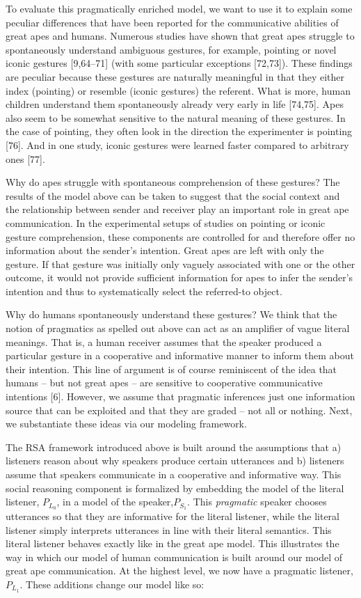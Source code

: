 \documentclass[
  english,
  man,floatsintext]{apa6}
\begin{document}
To evaluate this pragmatically enriched model, we want to use it to explain some peculiar differences that have been reported for the communicative abilities of great apes and humans. Numerous studies have shown that great apes struggle to spontaneously understand ambiguous gestures, for example, pointing or novel iconic gestures {[}9,64--71{]} (with some particular exceptions {[}72,73{]}). These findings are peculiar because these gestures are naturally meaningful in that they either index (pointing) or resemble (iconic gestures) the referent. What is more, human children understand them spontaneously already very early in life {[}74,75{]}. Apes also seem to be somewhat sensitive to the natural meaning of these gestures. In the case of pointing, they often look in the direction the experimenter is pointing {[}76{]}. And in one study, iconic gestures were learned faster compared to arbitrary ones {[}77{]}.

Why do apes struggle with spontaneous comprehension of these gestures? The results of the model above can be taken to suggest that the social context and the relationship between sender and receiver play an important role in great ape communication. In the experimental setups of studies on pointing or iconic gesture comprehension, these components are controlled for and therefore offer no information about the sender's intention. Great apes are left with only the gesture. If that gesture was initially only vaguely associated with one or the other outcome, it would not provide sufficient information for apes to infer the sender's intention and thus to systematically select the referred-to object.

Why do humans spontaneously understand these gestures? We think that the notion of pragmatics as spelled out above can act as an amplifier of vague literal meanings. That is, a human receiver assumes that the speaker produced a particular gesture in a cooperative and informative manner to inform them about their intention. This line of argument is of course reminiscent of the idea that humans -- but not great apes -- are sensitive to cooperative communicative intentions {[}6{]}. However, we assume that pragmatic inferences just one information source that can be exploited and that they are graded -- not all or nothing. Next, we substantiate these ideas via our modeling framework.

The RSA framework introduced above is built around the assumptions that a) listeners reason about why speakers produce certain utterances and b) listeners assume that speakers communicate in a cooperative and informative way. This social reasoning component is formalized by embedding the model of the literal listener, \(P_{L_0}\), in a model of the speaker,\(P_{S_1}\). This \emph{pragmatic} speaker chooses utterances so that they are informative for the literal listener, while the literal listener simply interprets utterances in line with their literal semantics. This literal listener behaves exactly like in the great ape model. This illustrates the way in which our model of human communication is built around our model of great ape communication. At the highest level, we now have a pragmatic listener, \(P_{L_1}\). These additions change our model like so:
\end{document}
